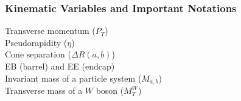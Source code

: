 \begin{frame}\frametitle{Kinematic Variables and Important Notations}

Transverse momentum ($P_T$)\\

Pseudorapidity ($\eta$)\\

Cone separation ($\Delta R(a,b)$)\\

EB (barrel) and EE (endcap)\\

Invariant mass of a particle system ($M_{a,b}$)\\

Transverse mass of a $W$ boson ($M_T^W$)

\end{frame}%


